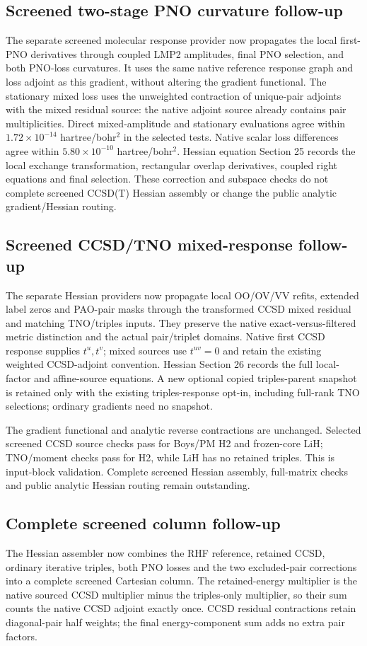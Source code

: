 \documentclass[11pt]{article}
\begin{document}
\subsection{Screened two-stage PNO curvature follow-up}
The separate screened molecular response provider now propagates the local
first-PNO derivatives through coupled LMP2 amplitudes, final PNO selection,
and both PNO-loss curvatures. It uses the same native reference response graph
and loss adjoint as this gradient, without altering the gradient functional.
The stationary mixed loss uses the unweighted contraction of unique-pair
adjoints with the mixed residual source: the native adjoint source already
contains pair multiplicities. Direct mixed-amplitude and stationary evaluations
agree within $1.72\times10^{-14}$ hartree/bohr$^2$ in the selected tests.
Native scalar loss differences agree within $5.80\times10^{-10}$ hartree/bohr$^2$.
Hessian equation Section 25 records the local exchange transformation,
rectangular overlap derivatives, coupled right equations and final selection.
These correction and subspace checks do not complete screened CCSD(T)
Hessian assembly or change the public analytic gradient/Hessian routing.

\subsection{Screened CCSD/TNO mixed-response follow-up}
The separate Hessian providers now propagate local OO/OV/VV refits, extended
label zeros and PAO-pair masks through the transformed CCSD mixed residual
and matching TNO/triples inputs. They preserve the native exact-versus-filtered
metric distinction and the actual pair/triplet domains. Native first CCSD
response supplies $t^u,t^v$; mixed sources use $t^{uv}=0$ and retain the
existing weighted CCSD-adjoint convention. Hessian Section 26 records the
full local-factor and affine-source equations. A new optional copied
triples-parent snapshot is retained only with the existing triples-response
opt-in, including full-rank TNO selections; ordinary gradients need no snapshot.

The gradient functional and analytic reverse contractions are unchanged.
Selected screened CCSD source checks pass for Boys/PM H2 and frozen-core LiH;
TNO/moment checks pass for H2, while LiH has no retained triples. This is
input-block validation. Complete screened Hessian assembly, full-matrix
checks and public analytic Hessian routing remain outstanding.


\subsection{Complete screened column follow-up}
The Hessian assembler now combines the RHF reference, retained CCSD,
ordinary iterative triples, both PNO losses and the two excluded-pair
corrections into a complete screened Cartesian column. The retained-energy
multiplier is the native sourced CCSD multiplier minus the triples-only
multiplier, so their sum counts the native CCSD adjoint exactly once.
CCSD residual contractions retain diagonal-pair half weights; the final
energy-component sum adds no extra pair factors.
\end{document}
